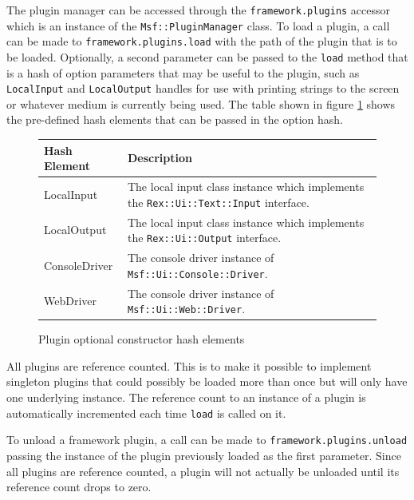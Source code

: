 \documentclass{report}
\begin{document}
\par
The plugin manager can be accessed through the
\texttt{framework.plugins} accessor which is an instance of the
\texttt{Msf::PluginManager} class. To load a plugin, a call can be
made to \texttt{framework.plugins.load} with the path of the plugin
that is to be loaded.  Optionally, a second parameter can be passed
to the \texttt{load} method that is a hash of option parameters that
may be useful to the plugin, such as \texttt{LocalInput} and
\texttt{LocalOutput} handles for use with printing strings to the
screen or whatever medium is currently being used.  The table shown
in figure \ref{fig-table-plugin-hash} shows the pre-defined hash
elements that can be passed in the option hash.

\begin{figure}[h]
\begin{center}
\begin{tabular}{|l|p{3.5in}|}
\hline
\textbf{Hash Element} & \textbf{Description} \\
\hline
LocalInput & The local input class instance which implements the \texttt{Rex::Ui::Text::Input} interface. \\
\hline
LocalOutput & The local input class instance which implements the \texttt{Rex::Ui::Output} interface. \\
\hline
ConsoleDriver & The console driver instance of \texttt{Msf::Ui::Console::Driver}. \\
\hline
WebDriver & The console driver instance of \texttt{Msf::Ui::Web::Driver}. \\
\hline
\end{tabular}
\caption{Plugin optional constructor hash elements}
\label{fig-table-plugin-hash}
\end{center}
\end{figure}

\par
All plugins are reference counted.  This is to make it possible to
implement singleton plugins that could possibly be loaded more than
once but will only have one underlying instance.  The reference
count to an instance of a plugin is automatically incremented each
time \texttt{load} is called on it.

\par
To unload a framework plugin, a call can be made to
\texttt{framework.plugins.unload} passing the instance of the plugin
previously loaded as the first parameter.  Since all plugins are
reference counted, a plugin will not actually be unloaded until its
reference count drops to zero.
\end{document}
